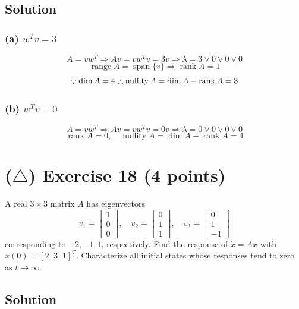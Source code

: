 \documentclass[12pt,a4paper]{article}
\begin{document}
\subsection*{Solution}

\subsubsection*{(a) $w^T v = 3$}
\[
A = vw^T \Rightarrow Av = vw^Tv = 3v \Rightarrow \lambda = 3 
\lor 0 \lor 0 \lor 0
\]
\[
\operatorname{range}A = \operatorname{span}\{v\} \Rightarrow \operatorname{rank}A = 1
\]
\[
\because \dim A = 4 \\ \therefore \operatorname{nullity} A= \dim A - \operatorname{rank} A = 3
\]

\subsubsection*{(b) $w^Tv = 0$ }

\[
A = vw^T \Rightarrow Av = vw^Tv = 0v\Rightarrow \lambda = 0 \lor 0 \lor 0 \lor 0
\]
\[
\operatorname{rank} A = 0, \quad \operatorname{nullity}A = \dim A - \operatorname{rank} A = 4
\]

\vspace{3cm}
\vfill
\clearpage
\section*{($\triangle$) Exercise 18 \hfill {\normalsize (4 points)}}
A real $3\times3$ matrix $A$ has eigenvectors
\[
v_1=\begin{bmatrix}1\\0\\0\end{bmatrix},\quad
v_2=\begin{bmatrix}0\\1\\1\end{bmatrix},\quad
v_3=\begin{bmatrix}0\\1\\-1\end{bmatrix}
\]
corresponding to $-2,-1,1$, respectively. Find the response of $\dot x=Ax$ with $x(0)=[2\;\;3\;\;1]^T$. Characterize all initial states whose responses tend to zero as $t\to\infty$.
\subsection*{Solution}
\end{document}
